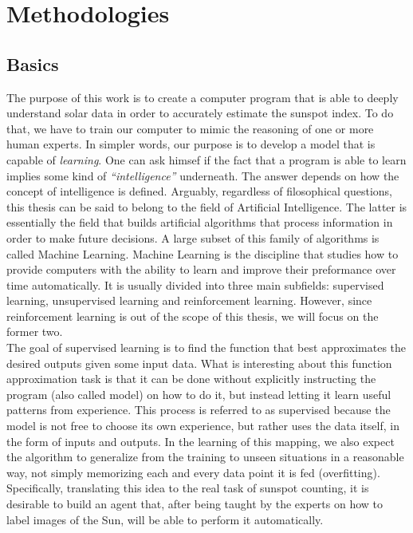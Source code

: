 \chapter{Methodologies}
\label{capitolo4}
\thispagestyle{empty}

\section{Basics}
\noindent The purpose of this work is to create a computer program that is able to deeply understand solar data in order to accurately estimate the sunspot index. To do that, we have to train our computer to mimic the reasoning of one or more human experts. In simpler words, our purpose is to develop a model that is capable of \textit{learning}. One can ask himsef if the fact that a program is able to learn implies some kind of \textit{``intelligence''} underneath. The answer depends on how the concept of intelligence is defined. Arguably, regardless of filosophical questions, this thesis can be said to belong to the field of Artificial Intelligence. The latter is essentially the field that builds artificial algorithms that process information in order to make future decisions. A large subset of this family of algorithms is called Machine Learning. Machine Learning is the discipline that studies how to provide computers with the ability to learn and improve their preformance over time automatically. It is usually divided into three main subfields: supervised learning, unsupervised learning and reinforcement learning. However, since reinforcement learning is out of the scope of this thesis, we will focus on the former two. \\
The goal of supervised learning is to find the function that best approximates the desired outputs given some input data. What is interesting about this function approximation task is that it can be done without explicitly instructing the program (also called model) on how to do it, but instead letting it learn useful patterns from experience. This process is referred to as supervised because the model is not free to choose its own experience, but rather uses the data itself, in the form of inputs and outputs. In the learning of this mapping, we also expect the algorithm to generalize from the training to unseen situations in a reasonable way, not simply memorizing each and every data point it is fed (overfitting). Specifically, translating this idea to the real task of sunspot counting, it is desirable to build an agent that, after being taught by the experts on how to label images of the Sun, will be able to perform it automatically.\\

